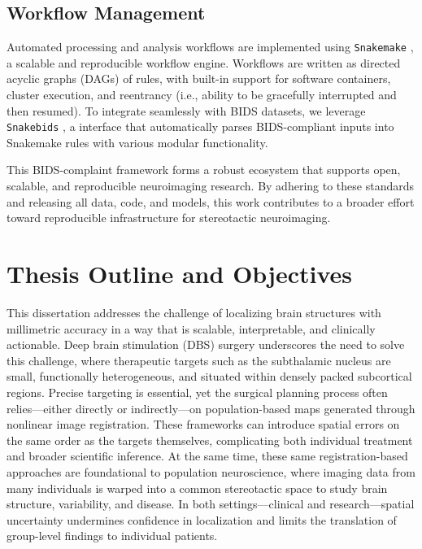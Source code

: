 \subsection{Workflow Management}
Automated processing and analysis workflows are implemented using \texttt{Snakemake} \cite{Molder2021-ig,Koster2012-ok}, a scalable and reproducible workflow engine. Workflows are written as directed acyclic graphs (DAGs) of rules, with built-in support for software containers, cluster execution, and reentrancy (i.e., ability to be gracefully interrupted and then resumed). To integrate seamlessly with BIDS datasets, we leverage \texttt{Snakebids} \cite{Van-Dyken-Tristan-Kuehn-Jason-Kai-Dahananjhay-Bansal-Ali-Khan2020-ay}, a interface that automatically parses BIDS-compliant inputs into Snakemake rules with various modular functionality. 

This BIDS-complaint framework forms a robust ecosystem that supports open, scalable, and reproducible neuroimaging research. By adhering to these standards and releasing all data, code, and models, this work contributes to a broader effort toward reproducible infrastructure for stereotactic neuroimaging.

\section{Thesis Outline and Objectives}

This dissertation addresses the challenge of localizing brain structures with millimetric accuracy in a way that is scalable, interpretable, and clinically actionable. Deep brain stimulation (DBS) surgery underscores the need to solve this challenge, where therapeutic targets such as the subthalamic nucleus are small, functionally heterogeneous, and situated within densely packed subcortical regions. Precise targeting is essential, yet the surgical planning process often relies—either directly or indirectly—on population-based maps generated through nonlinear image registration. These frameworks can introduce spatial errors on the same order as the targets themselves, complicating both individual treatment and broader scientific inference. At the same time, these same registration-based approaches are foundational to population neuroscience, where imaging data from many individuals is warped into a common stereotactic space to study brain structure, variability, and disease. In both settings—clinical and research—spatial uncertainty undermines confidence in localization and limits the translation of group-level findings to individual patients.


